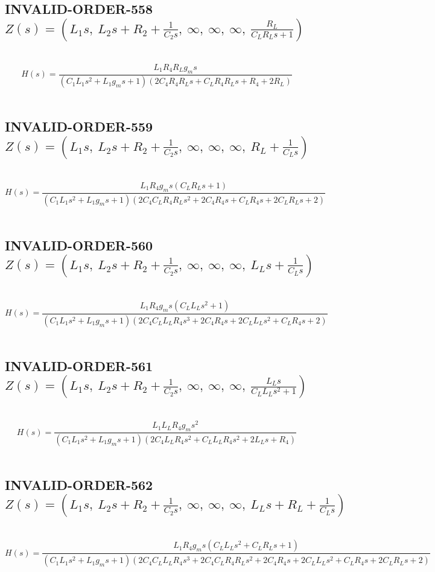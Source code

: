 \documentclass{article}
\begin{document}
\subsection{INVALID-ORDER-558 $Z(s) = \left( L_{1} s, \  L_{2} s + R_{2} + \frac{1}{C_{2} s}, \  \infty, \  \infty, \  \infty, \  \frac{R_{L}}{C_{L} R_{L} s + 1}\right)$ } \ 
\textbf{\[H(s) = \frac{L_{1} R_{4} R_{L} g_{m} s}{\left(C_{1} L_{1} s^{2} + L_{1} g_{m} s + 1\right) \left(2 C_{4} R_{4} R_{L} s + C_{L} R_{4} R_{L} s + R_{4} + 2 R_{L}\right)}\] } \ 
\subsection{INVALID-ORDER-559 $Z(s) = \left( L_{1} s, \  L_{2} s + R_{2} + \frac{1}{C_{2} s}, \  \infty, \  \infty, \  \infty, \  R_{L} + \frac{1}{C_{L} s}\right)$ } \ 
\textbf{\[H(s) = \frac{L_{1} R_{4} g_{m} s \left(C_{L} R_{L} s + 1\right)}{\left(C_{1} L_{1} s^{2} + L_{1} g_{m} s + 1\right) \left(2 C_{4} C_{L} R_{4} R_{L} s^{2} + 2 C_{4} R_{4} s + C_{L} R_{4} s + 2 C_{L} R_{L} s + 2\right)}\] } \ 
\subsection{INVALID-ORDER-560 $Z(s) = \left( L_{1} s, \  L_{2} s + R_{2} + \frac{1}{C_{2} s}, \  \infty, \  \infty, \  \infty, \  L_{L} s + \frac{1}{C_{L} s}\right)$ } \ 
\textbf{\[H(s) = \frac{L_{1} R_{4} g_{m} s \left(C_{L} L_{L} s^{2} + 1\right)}{\left(C_{1} L_{1} s^{2} + L_{1} g_{m} s + 1\right) \left(2 C_{4} C_{L} L_{L} R_{4} s^{3} + 2 C_{4} R_{4} s + 2 C_{L} L_{L} s^{2} + C_{L} R_{4} s + 2\right)}\] } \ 
\subsection{INVALID-ORDER-561 $Z(s) = \left( L_{1} s, \  L_{2} s + R_{2} + \frac{1}{C_{2} s}, \  \infty, \  \infty, \  \infty, \  \frac{L_{L} s}{C_{L} L_{L} s^{2} + 1}\right)$ } \ 
\textbf{\[H(s) = \frac{L_{1} L_{L} R_{4} g_{m} s^{2}}{\left(C_{1} L_{1} s^{2} + L_{1} g_{m} s + 1\right) \left(2 C_{4} L_{L} R_{4} s^{2} + C_{L} L_{L} R_{4} s^{2} + 2 L_{L} s + R_{4}\right)}\] } \ 
\subsection{INVALID-ORDER-562 $Z(s) = \left( L_{1} s, \  L_{2} s + R_{2} + \frac{1}{C_{2} s}, \  \infty, \  \infty, \  \infty, \  L_{L} s + R_{L} + \frac{1}{C_{L} s}\right)$ } \ 
\textbf{\[H(s) = \frac{L_{1} R_{4} g_{m} s \left(C_{L} L_{L} s^{2} + C_{L} R_{L} s + 1\right)}{\left(C_{1} L_{1} s^{2} + L_{1} g_{m} s + 1\right) \left(2 C_{4} C_{L} L_{L} R_{4} s^{3} + 2 C_{4} C_{L} R_{4} R_{L} s^{2} + 2 C_{4} R_{4} s + 2 C_{L} L_{L} s^{2} + C_{L} R_{4} s + 2 C_{L} R_{L} s + 2\right)}\] } \ 
\end{document}
